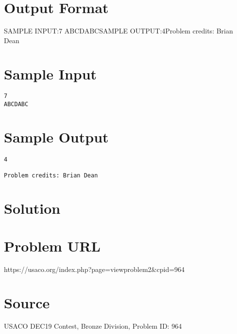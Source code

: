 \documentclass[12pt]{article}
\begin{document}
\section*{Output Format}
SAMPLE INPUT:7
ABCDABCSAMPLE OUTPUT:4Problem credits: Brian Dean

\section*{Sample Input}
\begin{verbatim}
7
ABCDABC
\end{verbatim}

\section*{Sample Output}
\begin{verbatim}
4

Problem credits: Brian Dean
\end{verbatim}

\section*{Solution}


\section*{Problem URL}
https://usaco.org/index.php?page=viewproblem2&cpid=964

\section*{Source}
USACO DEC19 Contest, Bronze Division, Problem ID: 964
\end{document}
